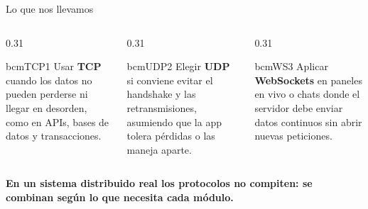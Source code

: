 \begin{frame}{Lo que nos llevamos}
  \begin{columns}[T]
    \begin{column}{0.31\textwidth}
      \begin{tarjeta}[equal height group=lecciones]{bcmTCP}{1}
        \small Usar \textbf{TCP} cuando los datos no pueden perderse ni llegar en desorden, como en APIs, bases de datos y transacciones.
      \end{tarjeta}
    \end{column}
    \begin{column}{0.31\textwidth}
      \begin{tarjeta}[equal height group=lecciones]{bcmUDP}{2}
        \small Elegir \textbf{UDP} si conviene evitar el handshake y las retransmisiones, asumiendo que la app tolera pérdidas o las maneja aparte.
      \end{tarjeta}
    \end{column}
    \begin{column}{0.31\textwidth}
      \begin{tarjeta}[equal height group=lecciones]{bcmWS}{3}
        \small Aplicar \textbf{WebSockets} en paneles en vivo o chats donde el servidor debe enviar datos continuos sin abrir nuevas peticiones.
      \end{tarjeta}
    \end{column}
  \end{columns}
  \vfill
  \begin{center}
    {\large\bfseries En un sistema distribuido real los protocolos no compiten: se combinan según lo que necesita cada módulo.\par}
  \end{center}
  \vfill
\end{frame}